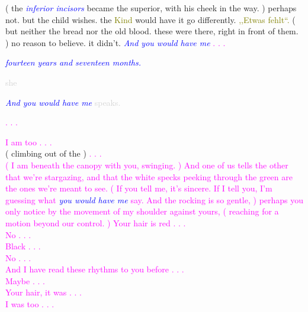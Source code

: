 \documentclass[11pt]{article}
\begin{document}
\begingroup
( the \textit{\textcolor{blue}{inferior incisors}} became the superior, with his cheek in the way. ) perhaps not. but the child wishes. the \textcolor{olive}{Kind} would have it go differently. \textcolor{olive}{,,Etwas fehlt“.} ( but neither the bread nor the old blood. these were there, right in front of them. ) no reason to believe. it didn't. \textit{\textcolor{blue}{And you would have me}} \textcolor{magenta}{. . .} \\ 
\begin{center}
\textit{\textcolor{blue}{fourteen years and seventeen months.}}
\end{center}
\endgroup

\begingroup
\begin{center}
\textcolor{lightgray}{she}
\rightskip\leftskip
\end{center}
\endgroup

\begingroup
\begin{center}
\textit{\textcolor{blue}{And you would have me}} \textcolor{lightgray}{speaks.}
\end{center}
\endgroup

\begingroup
\begin{center}
\textcolor{magenta}{. . .}
\end{center}
\endgroup

\begingroup
\begin{center}
\textcolor{magenta}{ I am too . . . } \\ ( climbing out of the ) \textcolor{magenta}{. . . \\  ( I am beneath the canopy with you, swinging. ) And one of us tells the other that we're stargazing, and that the white specks peeking through the green are the ones we're meant to see. ( If you tell me, it's sincere. If I tell you, I'm guessing what} \textit{\textcolor{blue}{you would have me}} \textcolor{magenta}{say. And the rocking is so gentle, ) perhaps you only notice by the movement of my shoulder against yours, ( reaching for a motion beyond our control. ) Your hair is red . . . \\ No . . . \\ Black . . . \\ No . . . \\ And I have read these rhythms to you before . . . \\ Maybe . . . \\ Your hair, it was . . . \\ I was too . . . }
\end{center}
\endgroup
\end{document}
